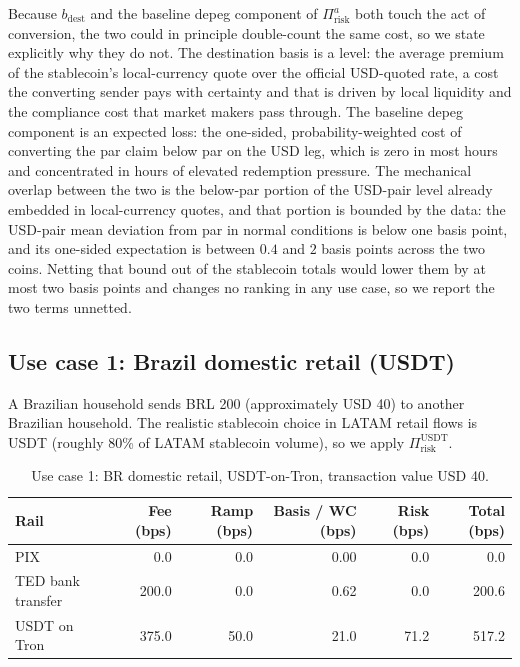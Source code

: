 Because $b_{\text{dest}}$ and the baseline depeg component of $\Pi_{\text{risk}}^{a}$ both touch the act of conversion, the two could in principle double-count the same cost, so we state explicitly why they do not. The destination basis is a level: the average premium of the stablecoin's local-currency quote over the official USD-quoted rate, a cost the converting sender pays with certainty and that is driven by local liquidity and the compliance cost that market makers pass through. The baseline depeg component is an expected loss: the one-sided, probability-weighted cost of converting the par claim below par on the USD leg, which is zero in most hours and concentrated in hours of elevated redemption pressure. The mechanical overlap between the two is the below-par portion of the USD-pair level already embedded in local-currency quotes, and that portion is bounded by the data: the USD-pair mean deviation from par in normal conditions is below one basis point, and its one-sided expectation is between $0.4$ and $2$ basis points across the two coins. Netting that bound out of the stablecoin totals would lower them by at most two basis points and changes no ranking in any use case, so we report the two terms unnetted.

\subsection{Use case 1: Brazil domestic retail (USDT)}\label{sub:bra_domestic}

A Brazilian household sends BRL 200 (approximately USD 40) to another Brazilian household. The realistic stablecoin choice in LATAM retail flows is USDT (roughly 80\% of LATAM stablecoin volume), so we apply $\Pi_{\text{risk}}^{\text{USDT}}$.

\begin{table}[H]
\centering
\caption{Use case 1: BR domestic retail, USDT-on-Tron, transaction value USD 40.}\label{tab:uc1}
\begin{tabular}{lrrrrr}
\toprule
Rail & Fee (bps) & Ramp (bps) & Basis / WC (bps) & Risk (bps) & Total (bps) \\
\midrule
PIX                  & 0.0    & 0.0  & 0.00  & 0.0  & 0.0   \\
TED bank transfer    & 200.0  & 0.0  & 0.62  & 0.0  & 200.6 \\
USDT on Tron         & 375.0  & 50.0 & 21.0  & 71.2 & 517.2 \\
\bottomrule
\end{tabular}
\end{table}

